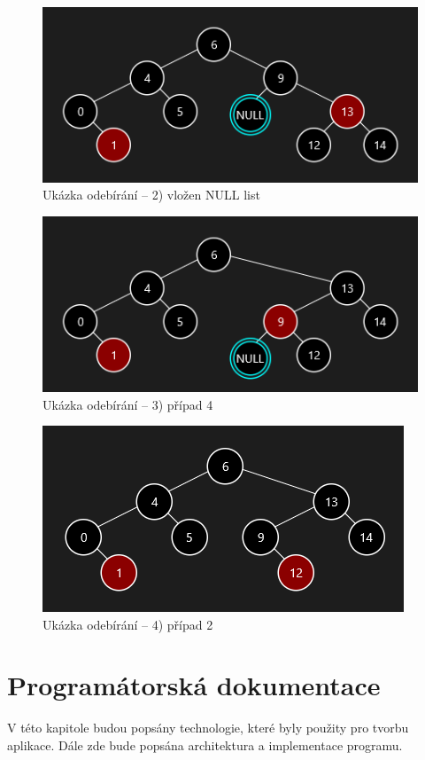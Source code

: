 \documentclass[
  biblatex=false,
  font=serif,
  glossaries=false,
  tables=false,
  theorems=false,
  index
]{kidiplom}
\begin{document}
\begin{figure}[h!]
\centering
	\includegraphics[scale=0.8]{obrazky/31CCMazani.png}
	\caption{Ukázka odebírání -- 2) vložen NULL list}
\end{figure}

\begin{figure}[h!]
\centering
	\includegraphics[scale=0.8]{obrazky/32CCMazani.png}
	\caption{Ukázka odebírání -- 3) případ 4}
\end{figure}

\begin{figure}[h!]
\centering
	\includegraphics[scale=0.8]{obrazky/33CCMazani.png}
	\caption{Ukázka odebírání -- 4) případ 2}
\end{figure}

\newpage
\section{Programátorská dokumentace}
\indent\indent V této kapitole budou popsány technologie, které byly použity pro tvorbu aplikace. Dále zde bude popsána architektura a implementace programu.
\end{document}
